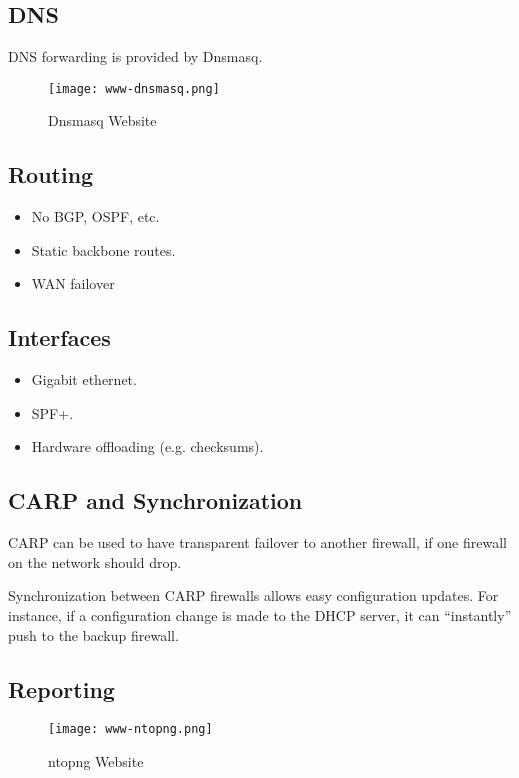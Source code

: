 \subsection{DNS}
DNS forwarding is provided by Dnsmasq.

\begin{figure}[h!]
\texttt{[image: www-dnsmasq.png]}
 \caption{Dnsmasq Website}
 \label{fig:www-dnsmasq}
\end{figure}



\subsection{Routing}
\begin{itemize}
 \item No BGP, OSPF, etc.
 \item Static backbone routes.
 \item WAN failover
\end{itemize}


\subsection{Interfaces}

\begin{itemize}
 \item Gigabit ethernet.
 \item SPF+.
 \item Hardware offloading (e.g. checksums).
\end{itemize}


\subsection{CARP and Synchronization}
CARP can be used to have transparent failover to another firewall, if one
firewall on the network should drop.

Synchronization between CARP firewalls allows easy configuration updates. For
instance, if a configuration change is made to the DHCP server, it can
``instantly'' push to the backup firewall.


\subsection{Reporting}

\begin{figure}[h!]
\texttt{[image: www-ntopng.png]}
 \caption{ntopng Website}
 \label{fig:www-ntopng}
\end{figure}

